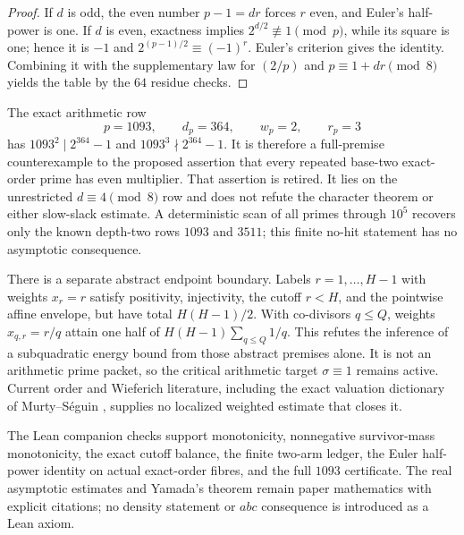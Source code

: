 \begin{proof}
If $d$ is odd, the even number $p-1=dr$ forces $r$ even, and Euler's
half-power is one.  If $d$ is even, exactness implies
$2^{d/2}\not\equiv1\pmod p$, while its square is one; hence it is $-1$ and
$2^{(p-1)/2}\equiv(-1)^r$.  Euler's criterion gives the identity.  Combining
it with the supplementary law for $(2/p)$ and $p\equiv1+dr\pmod8$ yields the
table by the $64$ residue checks.
\end{proof}

The exact arithmetic row
\[
 p=1093,\qquad d_p=364,\qquad w_p=2,\qquad r_p=3
\]
has $1093^2\mid2^{364}-1$ and $1093^3\nmid2^{364}-1$.  It is therefore a
full-premise counterexample to the proposed assertion that every repeated
base-two exact-order prime has even multiplier.  That assertion is retired.
It lies on the unrestricted $d\equiv4\pmod8$ row and does not refute the
character theorem or either slow-slack estimate.  A deterministic scan of all
primes through $10^5$ recovers only the known depth-two rows $1093$ and $3511$;
this finite no-hit statement has no asymptotic consequence.

There is a separate abstract endpoint boundary.  Labels
$r=1,\ldots,H-1$ with weights $x_r=r$ satisfy positivity, injectivity, the
cutoff $r<H$, and the pointwise affine envelope, but have total
$H(H-1)/2$.  With co-divisors $q\le Q$, weights $x_{q,r}=r/q$ attain one half
of $H(H-1)\sum_{q\le Q}1/q$.  This refutes the inference of a subquadratic
energy bound from those abstract premises alone.  It is not an arithmetic
prime packet, so the critical arithmetic target $\sigma\equiv1$ remains
active.  Current order and Wieferich literature, including the exact
valuation dictionary of Murty--S\'eguin \cite{MurtySeguin2019}, supplies no
localized weighted estimate that closes it.

The Lean companion checks support monotonicity, nonnegative survivor-mass
monotonicity, the exact cutoff balance, the finite two-arm ledger, the Euler
half-power identity on actual exact-order fibres, and the full $1093$
certificate.  The real asymptotic estimates and Yamada's theorem remain
paper mathematics with explicit citations; no density statement or $abc$
consequence is introduced as a Lean axiom.
